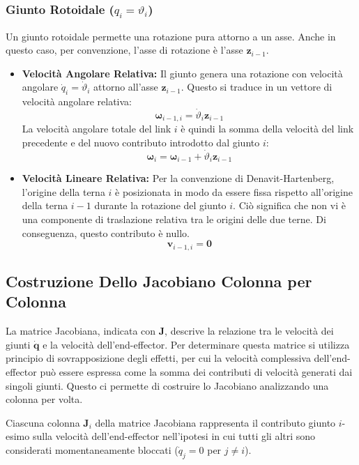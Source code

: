 \documentclass[11pt, a4paper]{report}
\begin{document}
\subsubsection{Giunto Rotoidale (\texorpdfstring{$q_i = \vartheta_i$}{qi = thetai})}
Un giunto rotoidale permette una rotazione pura attorno a un asse. Anche in questo caso, per convenzione, l'asse di rotazione è l'asse \(\bm{z}_{i-1}\).

\begin{itemize}
    \item \textbf{Velocità Angolare Relativa:} Il giunto genera una rotazione con velocità angolare \(\dot{q}_i = \dot{\vartheta}_i\) attorno all'asse \(\bm{z}_{i-1}\). Questo si traduce in un vettore di velocità angolare relativa:
    \[
        \bm{\omega}_{i-1,i} = \dot{\vartheta}_i \bm{z}_{i-1}
    \]
    La velocità angolare totale del link \(i\) è quindi la somma della velocità del link precedente e del nuovo contributo introdotto dal giunto \(i\):
    \[
        \bm{\omega}_i = \bm{\omega}_{i-1} + \dot{\vartheta}_i \bm{z}_{i-1}
    \]

    \item \textbf{Velocità Lineare Relativa:} Per la convenzione di Denavit-Hartenberg, l'origine della terna \(i\) è posizionata in modo da essere fissa rispetto all'origine della terna \(i-1\) durante la rotazione del giunto \(i\). Ciò significa che non vi è una componente di traslazione relativa tra le origini delle due terne. Di conseguenza, questo contributo è nullo.
    \[
        \bm{v}_{i-1,i} = \bm{0}
    \]
\end{itemize}
\newpage
\subsection{Costruzione Dello Jacobiano Colonna per Colonna}
La matrice Jacobiana, indicata con \(\bm{J}\), descrive la relazione tra le velocità dei giunti \(\dot{\bm{q}}\) e la velocità dell'end-effector. Per determinare questa matrice si utilizza principio di sovrapposizione degli effetti, per cui la velocità complessiva dell'end-effector può essere espressa come la somma dei contributi di velocità generati dai singoli giunti. Questo ci permette di costruire lo Jacobiano analizzando una colonna per volta.

Ciascuna colonna \(\bm{J}_i\) della matrice Jacobiana rappresenta il contributo giunto \(i\)-esimo sulla velocità dell'end-effector nell'ipotesi in cui tutti gli altri sono considerati momentaneamente bloccati (\(\dot{q}_j = 0\) per \(j \neq i\)).
\end{document}

